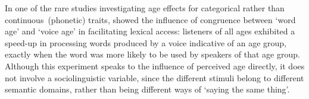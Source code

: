 

In one of the rare studies investigating age effects for categorical rather than continuous~(phonetic) traits, \citet{Walker2011} showed the influence of congruence between `word age' and `voice age' in facilitating lexical access: listeners of all ages exhibited a speed-up in processing words produced by a voice indicative of an age group, exactly when the word was more likely to be used by speakers of that age group. %
Although this experiment speaks to the influence of perceived age directly, it does not involve a sociolinguistic variable, since the different stimuli belong to different semantic domains, rather than being different ways of `saying the same thing'.



